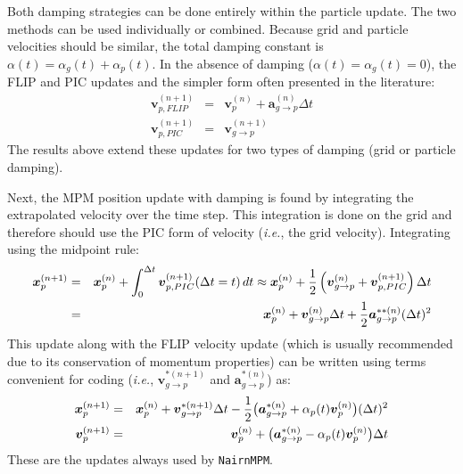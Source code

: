\documentclass[11pt]{article}
\renewcommand{\vec}[1]{\boldsymbol{#1}}
\begin{document}
Both damping strategies can be done entirely within the particle update. The two methods can be used individually or combined. Because grid and particle velocities should be similar, the total damping constant is $\alpha(t)=\alpha_g(t)+\alpha_p(t)$. In the absence of damping ($\alpha(t)=\alpha_g(t)=0$), the FLIP and PIC updates and the simpler form often presented in the literature:
\begin{eqnarray}
      \vec{v}_{p,FLIP}^{(n+1)}  & = & \vec{v}_p^{(n)} + \vec{a}_{g\to p}^{(n)} \Delta t   \\
      \vec{v}_{p,PIC}^{(n+1)}  & = & \vec v_{g\to p}^{(n+1)} 
\end{eqnarray}
The results above extend these updates for two types of damping (grid or particle damping).

Next, the MPM position update with damping is found by integrating the extrapolated velocity over the time step. This integration is done on the grid and therefore should use the PIC form of velocity (\emph{i.e.}, the grid velocity). Integrating using  the midpoint rule:
\begin{eqnarray}
        \vec{x}_p^{(n+1)} & = & \vec{x}_p^{(n)} + \int_0^{\Delta t} \vec v_{p,PIC}^{(n+1)}(\Delta t=t) \thinspace dt \approx \vec{x}_p^{(n)} 
         + {1\over 2}\left(\vec v_{g\to p}^{(n)}+\vec v_{p,PIC}^{(n+1)}\right) \Delta t \\
         & = & \vec{x}_p^{(n)} +\vec v_{g\to p}^{(n)}\Delta t + {1\over 2} \vec{a}_{g\to p}^{**(n)}(\Delta t)^2 
\end{eqnarray}
This update along with the FLIP velocity update (which is usually recommended due to its conservation of momentum properties) can be written using terms convenient for coding (\emph{i.e.}, $ \vec v_{g\to p}^{*(n+1)}$ and $\vec{a}_{g\to p}^{*(n)}$) as:
\begin{eqnarray}
   \vec{x}_{p}^{(n+1)} & = & \vec{x}_p^{(n)} + \vec v_{g\to p}^{*(n+1)}\Delta t - {1 \over 2}\bigl(\vec{a}_{g\to p}^{*(n)} +  \alpha_p(t)\vec v_p^{(n)} \bigr)(\Delta t)^2 \\
   \vec{v}_{p}^{(n+1)} & = & \vec{v}_p^{(n)} +  \bigl(\vec{a}_{g\to p}^{*(n)} -  \alpha_p(t)\vec v_p^{(n)} \bigr)\Delta t
\end{eqnarray}
These are the updates always used by {\tt NairnMPM}.
\end{document}
